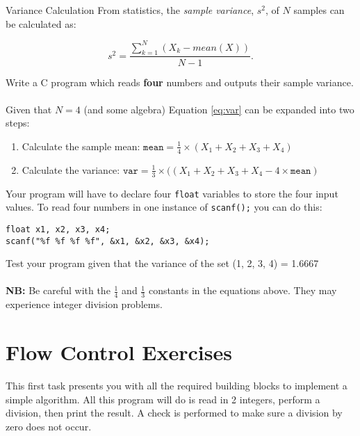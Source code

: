 \documentclass{lab}
\begin{document}
\begin{task}{Variance Calculation}{}
From statistics, the \textit{sample variance}, $s^2$, of $N$ samples can be calculated as:

\begin{equation}\label{eq:var}
s^2 = \frac{\sum_{k=1}^{N}(X_k - mean(X))}{N-1}.
\end{equation}

Write a C program which reads \textbf{four} numbers and outputs their sample variance.
\\ \\
Given that $N = 4$ (and some algebra) Equation \ref{eq:var} can be expanded into two steps:

\begin{enumerate}
\item Calculate the sample mean: $\texttt{mean} = \frac{1}{4} \times \left( X_1 + X_2 + X_3 + X_4 \right)$
\item Calculate the variance: $\texttt{var} = \frac{1}{3} \times ((X_1 + X_2 + X_3 + X_4 - 4 \times \texttt{mean})$
\end{enumerate}

Your program will have to declare four \texttt{float} variables to store the four input values. To read four numbers in one instance of \texttt{scanf();} you can do this:

\begin{lstlisting}[style=CStyle]
float x1, x2, x3, x4;
scanf("%f %f %f %f", &x1, &x2, &x3, &x4);
\end{lstlisting}

Test your program given that the variance of the set (1, 2, 3, 4) = 1.6667
\\ \\
\textbf{NB:} Be careful with the $\frac{1}{4}$ and $\frac{1}{3}$ constants in the equations above. They may experience integer division problems.

\end{task}

\pagebreak
\section{Flow Control Exercises}

This first task presents you with all the required building blocks to implement a simple algorithm. All this program will do is read in 2 integers, perform a division, then print the result. A check is performed to make sure a division by zero does not occur.
\end{document}
